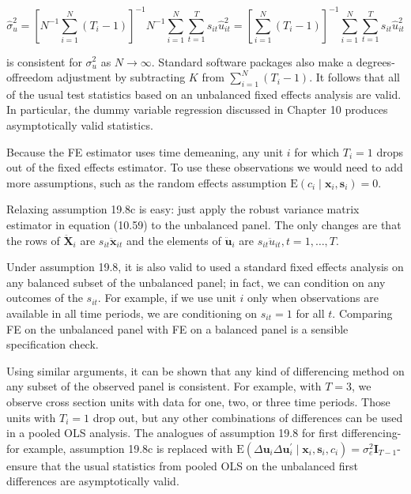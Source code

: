 \documentclass[10pt]{article}
\begin{document}
$$
\hat{\sigma}_{u}^{2}=\left[N^{-1} \sum_{i=1}^{N}\left(T_{i}-1\right)\right]^{-1} N^{-1} \sum_{i=1}^{N} \sum_{t=1}^{T} s_{i t} \hat{u}_{i t}^{2}=\left[\sum_{i=1}^{N}\left(T_{i}-1\right)\right]^{-1} \sum_{i=1}^{N} \sum_{t=1}^{T} s_{i t} \hat{u}_{i t}^{2}
$$

is consistent for $\sigma_{u}^{2}$ as $N \rightarrow \infty$. Standard software packages also make a degrees-offreedom adjustment by subtracting $K$ from $\sum_{i=1}^{N}\left(T_{i}-1\right)$. It follows that all of the usual test statistics based on an unbalanced fixed effects analysis are valid. In particular, the dummy variable regression discussed in Chapter 10 produces asymptotically valid statistics.

Because the FE estimator uses time demeaning, any unit $i$ for which $T_{i}=1$ drops out of the fixed effects estimator. To use these observations we would need to add more assumptions, such as the random effects assumption $\mathrm{E}\left(c_{i} \mid \mathbf{x}_{i}, \mathbf{s}_{i}\right)=0$.

Relaxing assumption 19.8c is easy: just apply the robust variance matrix estimator in equation (10.59) to the unbalanced panel. The only changes are that the rows of $\ddot{\mathbf{X}}_{i}$ are $s_{i t} \ddot{\mathbf{x}}_{i t}$ and the elements of $\ddot{\mathbf{u}}_{i}$ are $s_{i t} \ddot{u}_{i t}, t=1, \ldots, T$.

Under assumption 19.8, it is also valid to used a standard fixed effects analysis on any balanced subset of the unbalanced panel; in fact, we can condition on any outcomes of the $s_{i t}$. For example, if we use unit $i$ only when observations are available in all time periods, we are conditioning on $s_{i t}=1$ for all $t$. Comparing FE on the unbalanced panel with FE on a balanced panel is a sensible specification check.

Using similar arguments, it can be shown that any kind of differencing method on any subset of the observed panel is consistent. For example, with $T=3$, we observe cross section units with data for one, two, or three time periods. Those units with $T_{i}=1$ drop out, but any other combinations of differences can be used in a pooled OLS analysis. The analogues of assumption 19.8 for first differencing-for example, assumption 19.8c is replaced with $\mathrm{E}\left(\Delta \mathbf{u}_{i} \Delta \mathbf{u}_{i}^{\prime} \mid \mathbf{x}_{i}, \mathbf{s}_{i}, c_{i}\right)=\sigma_{e}^{2} \mathbf{I}_{T-1}$-ensure that the usual statistics from pooled OLS on the unbalanced first differences are asymptotically valid.
\end{document}
